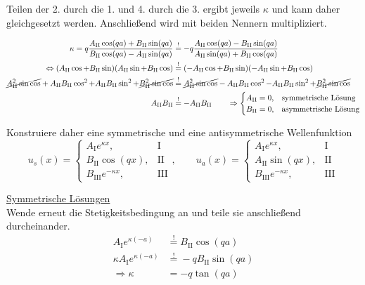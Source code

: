 \documentclass{article}
\begin{document}
{Teilen der 2. durch die 1. und 4. durch die 3. ergibt jeweils $\kappa$ und kann daher gleichgesetzt werden. Anschließend wird mit beiden Nennern multipliziert.


\newpage


	\begin{align*}
		\kappa = q\frac{A_\text{II}\cos(qa) + B_\text{II}\sin(qa)}{B_\text{II}\cos(qa) - A_\text{II}\sin(qa)} &\stackrel{!}{=} -q\frac{A_\text{II}\cos(qa) - B_\text{II}\sin(qa)}{A_\text{II}\sin(qa) + B_\text{II}\cos(qa)} \\
		\Leftrightarrow (A_\text{II}\cos +  B_\text{II}\sin)(A_\text{II}\sin +  B_\text{II}\cos) &\stackrel{!}{=} (-A_\text{II}\cos +  B_\text{II}\sin)(-A_\text{II}\sin +  B_\text{II}\cos) \\
		\cancel{A_\text{II}^2\sin\cos} + A_\text{II}B_\text{II}\cos^2 + A_\text{II}B_\text{II}\sin^2 + \cancel{B_\text{II}^2\sin\cos} &\stackrel{!}{=} \cancel{A_\text{II}^2\sin\cos} - A_\text{II}B_\text{II}\cos^2 - A_\text{II}B_\text{II}\sin^2 + \cancel{B_\text{II}^2\sin\cos} \\
		A_\text{II}B_\text{II} &\stackrel{!}{=} -A_\text{II}B_\text{II} \qquad\Rightarrow
		\begin{cases}
			A_\text{II} = 0, & \text{symmetrische Lösung} \\
			B_\text{II} = 0, & \text{asymmetrische Lösung} \\			
		\end{cases}
	\end{align*}


Konstruiere daher eine symmetrische und eine antisymmetrische Wellenfunktion
	$$u_s(x) =
	\begin{cases}
		A_\text{I}e^{\kappa x}, & \text{I}\\
		B_\text{II}\cos(qx), & \text{II}\\
		B_\text{III}e^{-\kappa x}, & \text{III}
	\end{cases},\qquad
	u_a(x) =
	\begin{cases}
		A_\text{I}e^{\kappa x}, & \text{I}\\
		A_\text{II}\sin(qx), & \text{II}\\
		B_\text{III}e^{-\kappa x}, & \text{III}
	\end{cases}$$

\underline{Symmetrische Lösungen}\\
Wende erneut die Stetigkeitsbedingung an und teile sie anschließend durcheinander.
	\begin{align*}
		A_\text{I} e^{\kappa (-a)} &\stackrel{!}{=} B_\text{II}\cos(qa) \\
		\kappa A_\text{I} e^{\kappa (-a)} &\stackrel{!}{=} -q B_\text{II}\sin(qa) \\
\Rightarrow \kappa &= -q \tan(qa)		
	\end{align*}

}
\end{document}
